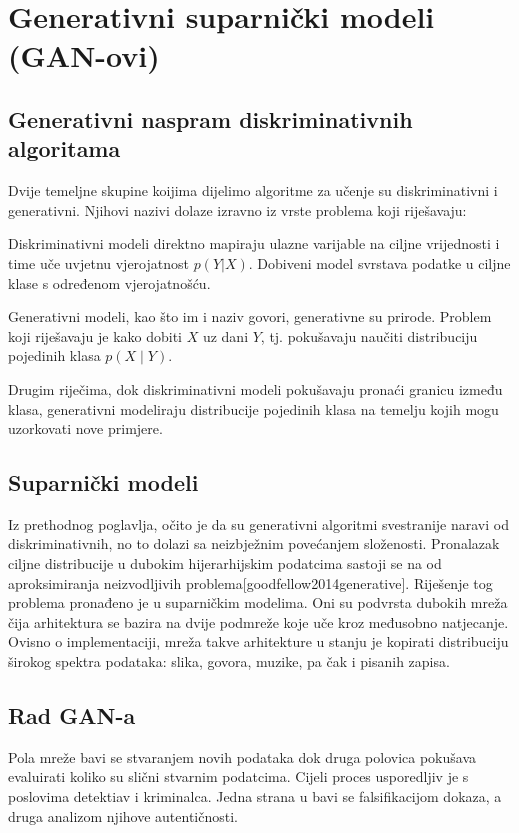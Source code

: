\documentclass[lmodern, utf8, seminar]{fer}
\begin{document}
\chapter{Generativni suparnički modeli (GAN-ovi)}
\section{Generativni naspram diskriminativnih algoritama}
Dvije temeljne skupine koijima dijelimo algoritme za učenje su diskriminativni i generativni.
Njihovi nazivi dolaze izravno iz vrste problema koji riješavaju: 
\newline

Diskriminativni modeli direktno mapiraju ulazne varijable na ciljne vrijednosti i time uče uvjetnu vjerojatnost $p(Y|X)$. Dobiveni model svrstava podatke u ciljne klase s određenom vjerojatnošću.

Generativni modeli, kao što im i naziv govori, generativne su prirode. Problem koji riješavaju je kako dobiti $X$ uz dani $Y$, tj. pokušavaju naučiti distribuciju pojedinih klasa $p(X \mid Y)$.
\newline

Drugim riječima, dok diskriminativni modeli pokušavaju pronaći granicu između klasa, generativni modeliraju distribucije pojedinih klasa na temelju kojih mogu uzorkovati nove primjere.
\newline

\section{Suparnički modeli}
Iz prethodnog poglavlja, očito je da su generativni algoritmi svestranije naravi od diskriminativnih, no to dolazi sa neizbježnim povećanjem složenosti. Pronalazak ciljne distribucije u dubokim hijerarhijskim podatcima sastoji se na od aproksimiranja neizvodljivih problema[goodfellow2014generative]. Riješenje tog problema pronađeno je u suparničkim modelima. Oni su podvrsta dubokih mreža čija arhitektura se bazira na dvije podmreže koje uče kroz međusobno natjecanje. Ovisno o implementaciji, mreža takve arhitekture u stanju je kopirati distribuciju širokog spektra podataka: slika, govora, muzike, pa čak i pisanih zapisa.
\newline

\section{Rad GAN-a}
Pola mreže bavi se stvaranjem novih podataka dok druga polovica pokušava evaluirati koliko su slični stvarnim podatcima.
Cijeli proces usporedljiv je s poslovima detektiav i kriminalca. Jedna strana u bavi se falsifikacijom dokaza, a druga analizom njihove autentičnosti.
\newline
\end{document}
